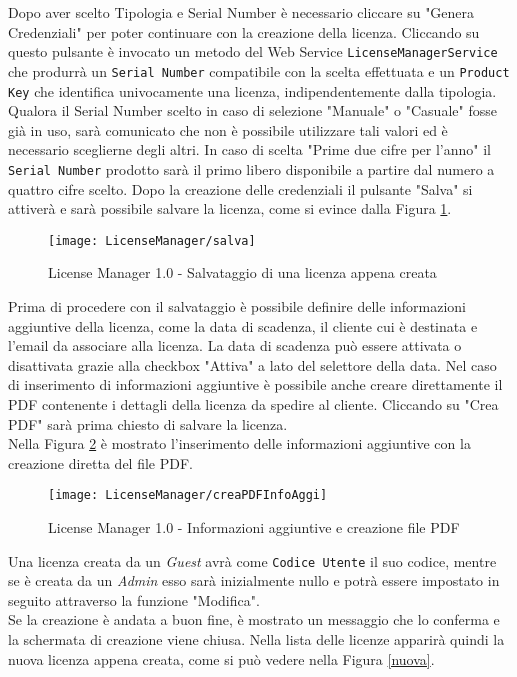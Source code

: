 Dopo aver scelto Tipologia e Serial Number è necessario cliccare su "Genera Credenziali" per poter continuare con la creazione della licenza. Cliccando su questo pulsante è invocato un metodo del Web Service \texttt{LicenseManagerService} che produrrà un \texttt{Serial Number} compatibile con la scelta effettuata e un \texttt{Product Key} che identifica univocamente una licenza, indipendentemente dalla tipologia. Qualora il Serial Number scelto in caso di selezione "Manuale" o "Casuale" fosse già in uso, sarà comunicato che non è possibile utilizzare tali valori ed è necessario sceglierne degli altri. In caso di scelta "Prime due cifre per l’anno" il \texttt{Serial Number} prodotto sarà il primo libero disponibile a partire dal numero a quattro cifre scelto. Dopo la creazione delle credenziali il pulsante "Salva" si attiverà e sarà possibile salvare la licenza, come si evince dalla Figura \ref{salva}.

 \begin{figure}[!h] 
    \centering 
    \texttt{[image: LicenseManager/salva]} 
    \caption{License Manager 1.0 - Salvataggio di una licenza appena creata}
\label{salva}
\end{figure}

Prima di procedere con il salvataggio è possibile definire delle informazioni aggiuntive della licenza, come la data di scadenza, il cliente cui è destinata e l’email da associare alla licenza. La data di scadenza può essere attivata o disattivata grazie alla checkbox "Attiva" a lato del selettore della data. Nel caso di inserimento di informazioni aggiuntive è possibile anche creare direttamente il PDF contenente i dettagli della licenza da spedire al cliente. Cliccando su "Crea PDF" sarà prima chiesto di salvare la licenza.
\\Nella Figura \ref{pdf} è mostrato l'inserimento delle informazioni aggiuntive con la creazione diretta del file PDF.


\begin{figure}[!h] 
    \centering 
    \texttt{[image: LicenseManager/creaPDFInfoAggi]} 
    \caption{License Manager 1.0 - Informazioni aggiuntive e creazione file PDF}
\label{pdf}
\end{figure}

Una licenza creata da un \textit{Guest} avrà come \texttt{Codice Utente} il suo codice, mentre se è creata da un \textit{Admin} esso sarà inizialmente nullo e potrà essere impostato in seguito attraverso la funzione "Modifica".
\\
Se la creazione è andata a buon fine, è mostrato un messaggio che lo conferma e la schermata di creazione viene chiusa. Nella lista delle licenze apparirà quindi la nuova licenza appena creata, come si può vedere nella Figura \ref{nuova}.

